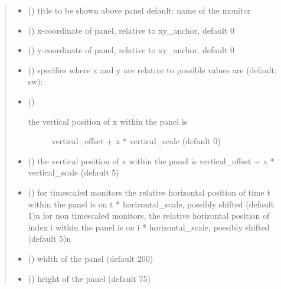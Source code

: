 \documentclass[letterpaper,10pt,english]{sphinxmanual}
\begin{document}
\begin{fulllineitems}
\begin{fulllineitems}
\begin{quote}
\begin{description}
\begin{itemize}
\item {} 
 () \textendash{} title to be shown above panel 
default: name of the monitor

\item {} 
 () \textendash{} x-coordinate of panel, relative to xy\_anchor, default 0

\item {} 
 () \textendash{} y-coordinate of panel, relative to xy\_anchor. default 0

\item {} 
 () \textendash{} specifies where x and y are relative to 
possible values are (default: sw): 

\item {} 
 () \textendash{} \begin{description}
\item[{the vertical position of x within the panel is}] \leavevmode
vertical\_offset + x * vertical\_scale (default 0)

\end{description}


\item {} 
 () \textendash{} the vertical position of x within the panel is
vertical\_offset + x * vertical\_scale (default 5)

\item {} 
 () \textendash{} for timescaled monitors the relative horizontal position of time t within the panel is on
t * horizontal\_scale, possibly shifted (default 1)\textbar{}n\textbar{}
for non timescaled monitors, the relative horizontal position of index i within the panel is on
i * horizontal\_scale, possibly shifted (default 5)\textbar{}n\textbar{}

\item {} 
 () \textendash{} width of the panel (default 200)

\item {} 
 () \textendash{} height of the panel (default 75)


\end{itemize}
\end{description}
\end{quote}
\end{fulllineitems}
\end{fulllineitems}
\end{document}
